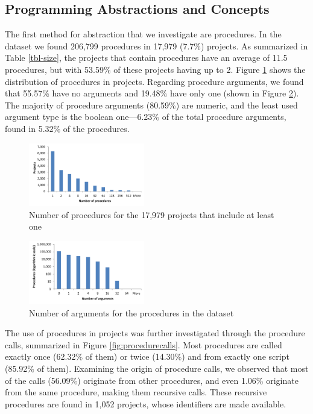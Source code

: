 \documentclass{sig-alternate}
\begin{document}
\subsection{Programming Abstractions and Concepts}
\label{RQ2}
The first method for abstraction that we investigate are procedures. In the dataset we found 206,799 procedures in 17,979 (7.7\%) projects. As summarized in Table \ref{tbl-size}, the projects that contain procedures have an average of 11.5 procedures, but with 53.59\% of these projects having up to 2. Figure \ref{fig:proceduresperproject} shows the distribution of procedures in projects. Regarding procedure arguments, we found that 55.57\% have no arguments and 19.48\% have only one (shown in Figure \ref{fig:procedurearguments}). The majority of procedure arguments (80.59\%) are numeric, and the least used argument type is the boolean one---6.23\% of the total procedure arguments, found in 5.32\% of the procedures.

\begin{figure}
	\centering
	\includegraphics[width=0.45\textwidth]{fig/charts/6proceduresperproject}
	\vspace{-1em}
	\caption{Number of procedures for the 17,979 projects that include at least one}
	\label{fig:proceduresperproject}
\end{figure}

\begin{figure}
	\centering
	\includegraphics[width=0.45\textwidth]{fig/charts/5arguments}
	\vspace{-1em}
	\caption{Number of arguments for the procedures in the dataset}
	\label{fig:procedurearguments}
\end{figure}

The use of procedures in projects was further investigated through the procedure calls, summarized in Figure \ref{fig:procedurecalls}. Most procedures are called exactly once (62.32\% of them) or twice (14.30\%) and from exactly one script (85.92\% of them). Examining the origin of procedure calls, we observed that most of the calls (56.09\%) originate from other procedures, and even 1.06\% originate from the same procedure, making them recursive calls. These recursive procedures are found in 1,052 projects, whose identifiers are made available.\footnotemark[\ref{repo}]
\end{document}
